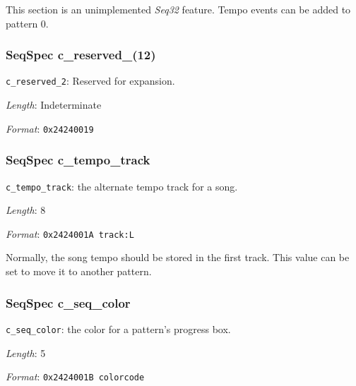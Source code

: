    This section is an unimplemented \textsl{Seq32} feature.
   Tempo events can be added to pattern 0.

\subsubsection{SeqSpec c\_reserved\_(12)}
\label{subsubsec:midi_format_track_seqspec_reserved_1_2}

   \begin{description}
      \item \texttt{c\_reserved\_2}: Reserved for expansion.
      \item \textsl{Length}: Indeterminate
      \item \textsl{Format}: \texttt{0x24240019}
   \end{description}

\subsubsection{SeqSpec c\_tempo\_track}
\label{subsubsec:midi_format_track_seqspec_tempo_track}

   \begin{description}
      \item \texttt{c\_tempo\_track}:
         the alternate tempo track for a song.
      \item \textsl{Length}: 8
      \item \textsl{Format}: \texttt{0x2424001A track:L}
   \end{description}

   Normally, the song tempo should be stored in the first track.
   This value can be set to move it to another pattern.

\subsubsection{SeqSpec c\_seq\_color}
\label{subsubsec:midi_format_track_seqspec_seq_color}

   \begin{description}
      \item \texttt{c\_seq\_color}: the color for a pattern's
         progress box.
      \item \textsl{Length}: 5
      \item \textsl{Format}: \texttt{0x2424001B colorcode}
   \end{description}

